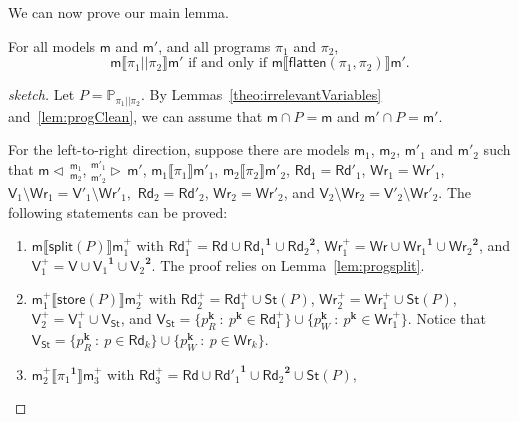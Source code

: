 \documentclass{llncs}
\newcommand{\progStore}{\mathsf{store}}
\newcommand{\progsplit}{\mathsf{split}}
\newcommand{\progFlatten}{\mathsf{flatten}}
\newcommand{\cp}[2]{{#2}^\mathbf{#1}}
\newcommand{\cpr}[2]{\cp{#1}{#2}_R}
\newcommand{\cpw}[2]{\cp{#1}{#2}_W}
\newcommand{\modl}{\mathsf m}
\newcommand{\mrg}[3]{ ^{#2}_{#3} \triangleright \, #1 }
\newcommand{\pll}{ {||} }							%
\newcommand{\splt}[3]{ #1 \triangleleft \, ^{#2}_{#3} }
\newcommand{\readset}{\mathsf{Rd}}
\newcommand{\valuset}{\mathsf{V}}
\newcommand{\writeset}{\mathsf{Wr}}
\newcommand{\storeset}{\mathsf{St}}
\newcommand{\intPgm}[1]{\llbracket #1 \rrbracket}
\newcommand{\propset}{\mathbb P}
\newcommand{\propsetOf}[1]{\propset_{#1}}
\newcommand{\modinter}{\cap}
\newcommand{\set}[1]{\{#1\}}
\newcommand{\suchthat}{~ : ~}
\begin{document}
We can now prove our main lemma.

\begin{lemma}\label{lem:pllequivalence}
For all models $\modl$ and $\modl'$, and all programs $\pi_1$ and $\pi_2$,
$$
\modl \intPgm{\pi_1 \pll \pi_2} \modl' \text{ if and only if }
\modl \intPgm{\progFlatten(\pi_1, \pi_2)} \modl' \text{.}
$$
\end{lemma}
\begin{proof}[sketch]
Let $P = \propsetOf{\pi_1 \pll \pi_2}$. By Lemmas~\ref{theo:irrelevantVariables} and~\ref{lem:progClean},
we can assume that $\modl \modinter P = \modl$ and $\modl' \modinter P = \modl'$.

For the left-to-right direction, suppose there are models $\modl_1$, $\modl_2$, $\modl'_1$ and $\modl'_2$ such that
$\splt{\modl}{\modl_1} {\modl_2} $, $\mrg{\modl'}{\modl'_1} {\modl'_2} $,
$\modl_1 \intPgm{ \pi_1 } \modl'_1$, 
$\modl_2 \intPgm{ \pi_2 } \modl'_2$, 
$\readset_1 = \readset'_1 $, $\writeset_1 = \writeset'_1 $, $\valuset_1 \setminus \writeset_1 = \valuset'_1 \setminus \writeset'_1 , $
$\readset_2 = \readset'_2 $, $\writeset_2 = \writeset'_2 $, and $\valuset_2 \setminus \writeset_2 = \valuset'_2 \setminus \writeset'_2 $.
The following statements can be proved:
\begin{enumerate}
  \item\label{pllequivalence:ltr:split}
        $\modl \intPgm{\progsplit(P)} \modl^+_1$ with
        $\readset^+_1 = \readset \cup \cp 1 {\readset_1} \cup \cp 2 {\readset_2}$,
        $\writeset^+_1 = \writeset \cup \cp 1 {\writeset_1} \cup \cp 2 {\writeset_2}$, and
        $\valuset^+_1 = \valuset \cup \cp 1 {\valuset_1} \cup \cp 2 {\valuset_2}$.
        The proof relies on Lemma~\ref{lem:progsplit}.
  \item\label{pllequivalence:ltr:store}
        $\modl^+_1 \intPgm{\progStore(P)} \modl^+_2$ with
        $\readset^+_2 = \readset^+_1 \cup \storeset(P)$,
        $\writeset^+_2 = \writeset^+_1 \cup \storeset(P)$,
        $\valuset^+_2 = \valuset^+_1 \cup \valuset_{\storeset}$, and
        $\valuset_{\storeset} =
        \set{ \cpr k p \suchthat \cp k p \in \readset^+_1} \cup
        \set{ \cpw k p \suchthat \cp k p \in \writeset^+_1}$.
        Notice that
        $\valuset_{\storeset} =
        \set{ \cpr k p \suchthat p \in \readset_k} \cup
        \set{ \cpw k p \suchthat p \in \writeset_k}$.
  \item\label{pllequivalence:ltr:pi1}
        $\modl^+_2 \intPgm{\cp 1 {\pi_1}} \modl^+_3$ with
        $\readset^+_3 = \readset \cup \cp 1 {\readset'_1} \cup \cp 2 {\readset_2} \cup \storeset(P)$,

\end{enumerate}
\end{proof}
\end{document}
